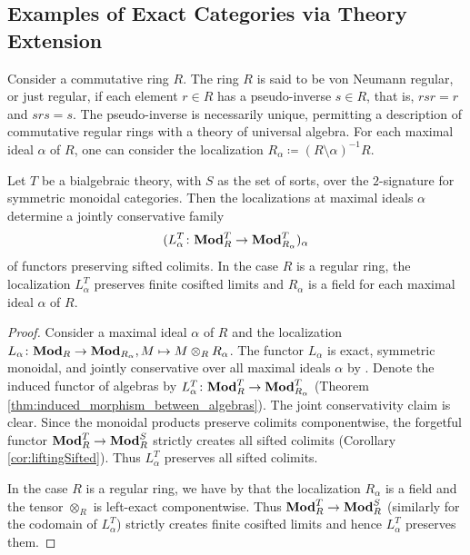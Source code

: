 \subsection{Examples of Exact Categories via Theory Extension}

Consider a commutative ring $R$. The ring $R$ is said to be von Neumann regular, or just regular, if each element $r\in R$ has a pseudo-inverse $s\in R$, that is, $rsr = r$ and $srs = s$. The pseudo-inverse is necessarily unique, permitting a description of commutative regular rings with a theory of universal algebra. For each maximal ideal $\alpha$ of $R$, one can consider the localization $R_\alpha\coloneqq (R\setminus \alpha)^{-1}R$.
\begin{lemma}\label{lem:localizations}
    Let $T$ be a bialgebraic theory, with $S$ as the set of sorts, over the $2$-signature for symmetric monoidal categories. Then the localizations at maximal ideals $\alpha$ determine a jointly conservative family 
    $$
    (L_\alpha^T\colon \mathbf{Mod}_R^T\to\mathbf{Mod}_{R_\alpha}^T)_\alpha
    $$
    of functors preserving sifted colimits. In the case $R$ is a regular ring, the localization $L^T_\alpha$ preserves finite cosifted limits and $R_\alpha$ is a field for each maximal ideal $\alpha$ of $R$.
\end{lemma}
\begin{proof}
    Consider a maximal ideal $\alpha$ of $R$ and the localization $L_\alpha\colon \mathbf{Mod}_R\to \mathbf{Mod}_{R_\alpha}, M\mapsto M\otimes_{R} R_\alpha$. The functor $L_\alpha$ is exact, symmetric monoidal, and jointly conservative over all maximal ideals $\alpha$ by \cite[Chapter 3]{atiyah_introduction_1969}. Denote the induced functor of algebras by $L_\alpha^T\colon \mathbf{Mod}_R^T\to \mathbf{Mod}_{R_\alpha}^T$ (Theorem \ref{thm:induced_morphism_between_algebras}). The joint conservativity claim is clear. Since the monoidal products preserve colimits componentwise, the forgetful functor $\mathbf{Mod}_R^T\to \mathbf{Mod}_R^S$ strictly creates all sifted colimits (Corollary \ref{cor:liftingSifted}). Thus $L_\alpha^T$ preserves all sifted colimits. 

    In the case $R$ is a regular ring, we have by \cite[Chapter~2, Exercise~27; Chapter~3, Exercise~10]{atiyah_introduction_1969} that the localization $R_\alpha$ is a field and the tensor $\otimes_R$ is left-exact componentwise. Thus $\mathbf{Mod}_R^T\to \mathbf{Mod}_R^S$ (similarly for the codomain of $L_\alpha^T$) strictly creates finite cosifted limits and hence $L_\alpha^T$ preserves them.
\end{proof}
